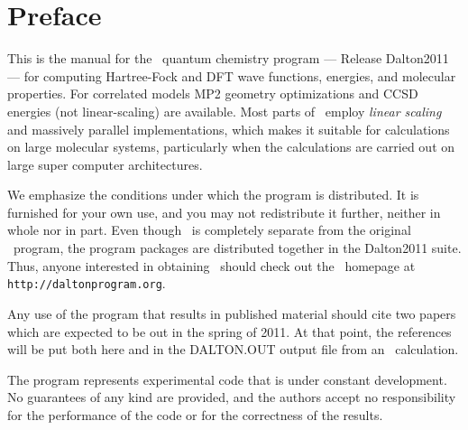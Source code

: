 \tableofcontents

\chapter*{Preface}

This is the manual for the \lsdalton\ quantum chemistry program
--- Release Dalton2011 --- for computing Hartree-Fock and DFT
wave functions, energies, and molecular properties.
For correlated models MP2 geometry optimizations and CCSD energies (not linear-scaling) are available.
Most parts of \lsdalton\ employ {\em linear scaling} and massively parallel implementations, which makes it suitable for calculations on large molecular systems, particularly when the calculations are carried out on large super computer architectures.

We emphasize the conditions under which the
program is distributed.  It is furnished for your own use,
and you may not redistribute it further, neither in whole nor in
part.  Even though \lsdalton\ is completely separate from the original
\dalton\ program, the program packages are distributed together in the
Dalton2011 suite. Thus, 
anyone interested in obtaining \lsdalton\ should check out the
\dalton\ homepage at
\verb|http://daltonprogram.org|.

Any use of the program that results in published
material should cite two papers which are expected to be out in the spring
of 2011. At that point, the references will be put both here and in the DALTON.OUT
output file from an \lsdalton\ calculation.

The program represents experimental code that is
under constant development.  No guarantees of any kind are
provided, and the authors accept no responsibility for the
performance of the code or for the correctness of the results.
